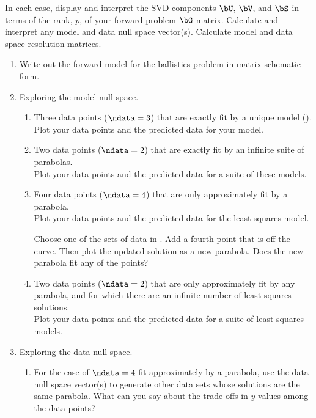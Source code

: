 \documentclass[11pt,titlepage,fleqn]{article}
\begin{document}
In each case, display and interpret the SVD components $\bU$, $\bV$, and $\bS$ in terms of the rank, $p$, of your forward problem $\bG$ matrix.
Calculate and interpret any model and data null space vector(s).
Calculate model and data space resolution matrices.
%
\begin{enumerate}
\item Write out the forward model for the ballistics problem in matrix schematic form.

\item Exploring the model null space.

\begin{enumerate}
\item Three data points ($\ndata = 3$) that are exactly fit by a unique model (). \\
Plot your data points and the predicted data for your model.

\item Two data points ($\ndata = 2$) that are exactly fit by an infinite suite of parabolas. \\
Plot your data points and the predicted data for a suite of these models.

\item Four data points ($\ndata = 4$) that are only approximately fit by a parabola. \\
Plot your data points and the predicted data for the least squares model.

Choose one of the sets of data in . Add a fourth point that is off the curve. Then plot the updated solution as a new parabola. Does the new parabola fit any of the points?

\item Two data points ($\ndata = 2$) that are only approximately fit by any parabola, and for which there are an infinite number of least squares solutions. \\
Plot your data points and the predicted data for a suite of least squares models.
\end{enumerate}

\item Exploring the data null space.

\begin{enumerate}
\item For the case of $\ndata = 4$ fit approximately by a parabola, use the data null space vector(s) to generate other data sets whose solutions are the same parabola. What can you say about the trade-offs in $y$ values among the data points?
\end{enumerate}

\end{enumerate}
\end{document}
